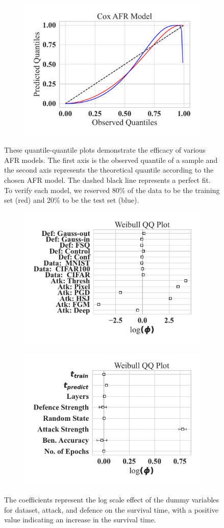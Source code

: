 \begin{figure}
\begin{subfigure}
	\end{subfigure}
	~
	\begin{subfigure}
		\centering
		\includegraphics[width=.32\textwidth]{plots/cox_qq.pdf}
	\end{subfigure}
	\caption{These quantile-quantile plots demonstrate the efficacy of various AFR models. The first axis is the observed quantile of a sample and the second axis represents the theoretical quantile according to the chosen AFR model. The dashed black line represents a perfect fit. To verify each model, we reserved 80\% of the data to be the training set (red) and 20\% to be the test set (blue). 
 }
	\label{fig:afr_models}
\end{figure}

\begin{figure}
    \centering
	\begin{subfigure}
	\centering
    \includegraphics[width=.38\textwidth]{plots/weibull_aft_dummies.pdf}
    \label{fig:covariates}
    \end{subfigure}
    \begin{subfigure}
	\centering
    \includegraphics[width=.38\textwidth]{plots/weibull_aft.pdf}
    \label{fig:dummies}
    \end{subfigure}
    \caption{The coefficients represent the log scale effect of the dummy variables for dataset, attack, and defence on the survival time, with a positive value indicating an increase in the survival time.}
\end{figure}



